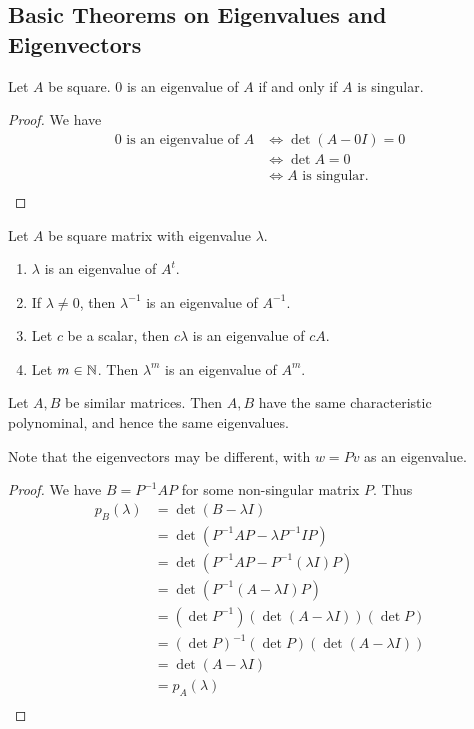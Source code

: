 \documentclass{article}
\begin{document}
\subsection{Basic Theorems on Eigenvalues and Eigenvectors}
\begin{theorem}
  Let $A$ be square. $0$ is an eigenvalue of $A$ if and only if $A$ is singular.
\end{theorem}
\begin{proof}
  We have
  \begin{align*}
    0 \text{ is an eigenvalue of }A &\iff \det (A - 0I) = 0\\
    &\iff \det A = 0\\
    &\iff A \text{ is singular.}\\
  \end{align*}
\end{proof}

\begin{theorem}
  Let $A$ be square matrix with eigenvalue $\lambda$.
  \begin{enumerate}
    \item $\lambda$ is an eigenvalue of $A^t$.
    \item If $\lambda \neq 0$, then $\lambda^{-1}$ is an eigenvalue of $A^{-1}$.
    \item Let $c$ be a scalar, then $c\lambda$ is an eigenvalue of $cA$.
    \item Let $m \in \mathbb{N}$. Then $\lambda^m$ is an eigenvalue of $A^m$.
  \end{enumerate}
\end{theorem}
\begin{theorem}
  Let $A, B$ be similar matrices. Then $A, B$ have the same characteristic polynominal, and hence the same eigenvalues.

  Note that the eigenvectors may be different, with $w = Pv$ as an eigenvalue.
\end{theorem}
\begin{proof}
  We have $B = P^{-1}AP$ for some non-singular matrix $P$. Thus
  \begin{align*}
    p_B(\lambda) &= \det (B - \lambda I)\\
    &= \det (P^{-1}AP - \lambda P^{-1}IP)\\
    &= \det (P^{-1}AP - P^{-1}(\lambda I)P)\\
    &= \det (P^{-1} (A - \lambda I)P)\\
    &= (\det P^{-1})(\det (A - \lambda I))(\det P)\\
    &= (\det P)^{-1}(\det P)(\det (A - \lambda I))\\
    &= \det (A - \lambda I)\\
    &= p_A(\lambda)\\
  \end{align*}
\end{proof}
\end{document}
